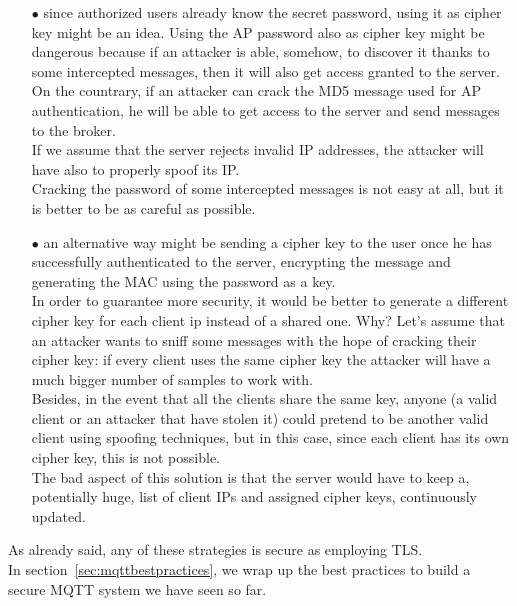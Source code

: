 \documentclass[12pt]{report}
\begin{document}
{{\begin{itemize}
\setlength{\itemindent}{+4mm}
\item[$\bullet$] since authorized users already know the secret password, using it as cipher key might be an idea. Using the AP password also as cipher key might be dangerous because if an attacker is able, somehow, to discover it thanks to some intercepted messages, then it will also get access granted to the server.\\
On the countrary, if an attacker can crack the MD5 message used for AP authentication, he will be able to get access to the server and send messages to the broker.\\
If we assume that the server rejects invalid IP addresses, the attacker will have also to properly spoof its IP.\\
Cracking the password of some intercepted messages is not easy at all, but it is better to be as careful as possible.
\item[$\bullet$] an alternative way might be sending a cipher key to the user once he has successfully authenticated to the server, encrypting the message and generating the MAC using the password as a key. \\
In order to guarantee more security, it would be better to generate a different cipher key for each client ip instead of a shared one. Why?
Let's assume that an attacker wants to sniff some messages with the hope of cracking their cipher key: if every client uses the same cipher key the attacker will have a much bigger number of samples to work with.\\
Besides, in the event that all the clients share the same key, anyone (a valid client or an attacker that have stolen it) could pretend to be another valid client using spoofing techniques, but in this case, since each client has its own cipher key, this is not possible.\\


The bad aspect of this solution is that the server would have to keep a, potentially huge, list of client IPs and assigned cipher keys, continuously updated.\\
\end{itemize}

As already said, any of these strategies is secure as employing TLS.\\

In section~\ref{sec:mqttbestpractices}, we wrap up the best practices to build a secure MQTT system we have seen so far.\\

}}
\end{document}
